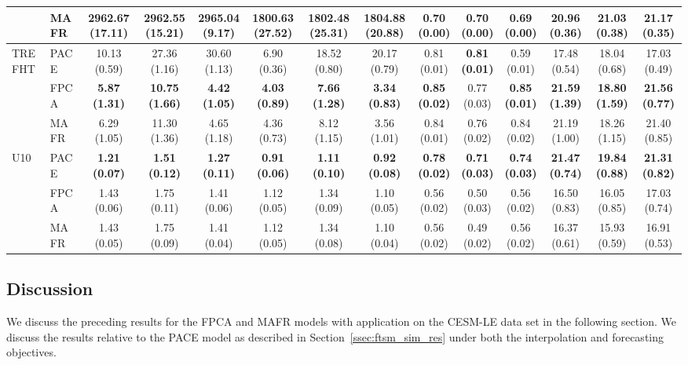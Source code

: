 \begin{landscape}
\begin{table}
{\begin{tabular}{l l c c c c c c c c c c c c}
			& MAFR  & 2962.67 (17.11) & 2962.55 (15.21) & \textbf{2965.04 (9.17)} & 1800.63 (27.52) & 1802.48 (25.31) & \textbf{1804.88 (20.88)} & 0.70 (0.00) & 0.70 (0.00) & 0.69 (0.00) & 20.96 (0.36) & 21.03 (0.38) & 21.17 (0.35)  \\
			\midrule
			\multirow{3}{*}{TREFHT} &PACE & 10.13 (0.59) & 27.36 (1.16) & 30.60 (1.13) & 6.90 (0.36) & 18.52 (0.80) & 20.17 (0.79) & 0.81 (0.01) & \textbf{0.81 (0.01)} & 0.59 (0.01)  & 17.48 (0.54) & 18.04 (0.68) & 17.03 (0.49)  \\
			& FPCA  & \textbf{5.87 (1.31)} & \textbf{10.75 (1.66)} & \textbf{4.42 (1.05)} & \textbf{4.03 (0.89)} & \textbf{7.66 (1.28)} & \textbf{3.34 (0.83)} & \textbf{0.85 (0.02)} & 0.77 (0.03) & \textbf{0.85 (0.01)} & \textbf{21.59 (1.39)} & \textbf{18.80 (1.59)} & \textbf{21.56 (0.77)}  \\
			& MAFR  & 6.29 (1.05) & 11.30 (1.36) & 4.65 (1.18) & 4.36 (0.73) & 8.12 (1.15) & 3.56 (1.01) & 0.84 (0.01) & 0.76 (0.02) & 0.84 (0.02) & 21.19 (1.00) & 18.26 (1.15) & 21.40 (0.85) \\
			\midrule
			\multirow{3}{*}{U10} & PACE & \textbf{1.21 (0.07)} & \textbf{1.51 (0.12)} & \textbf{1.27 (0.11)} & \textbf{0.91 (0.06)} & \textbf{1.11 (0.10)} & \textbf{0.92 (0.08)} & \textbf{0.78 (0.02)} & \textbf{0.71 (0.03)} & \textbf{0.74 (0.03)} & \textbf{21.47 (0.74)} & \textbf{19.84 (0.88)} & \textbf{21.31 (0.82)}  \\
			& FPCA  & 1.43 (0.06) & 1.75 (0.11) & 1.41 (0.06) & 1.12 (0.05) & 1.34 (0.09) & 1.10 (0.05) & 0.56 (0.02) & 0.50 (0.03) & 0.56 (0.02) & 16.50 (0.83) & 16.05 (0.85) & 17.03 (0.74)  \\
			& MAFR  & 1.43 (0.05) & 1.75 (0.09) & 1.41 (0.04) & 1.12 (0.05) & 1.34 (0.08) & 1.10 (0.04) & 0.56 (0.02) & 0.49 (0.02) & 0.56 (0.02)  & 16.37 (0.61) & 15.93 (0.59) & 16.91 (0.53) \\
			\bottomrule
		\end{tabular}}
	\end{table}
\end{landscape}

\subsection{Discussion \label{ssec:ftsm_eo_disc}}
We discuss the preceding results for the FPCA and MAFR models with application on the CESM-LE data set in the following section.
We discuss the results relative to the PACE model as described in Section~\ref{ssec:ftsm_sim_res} under both the interpolation and forecasting objectives.

